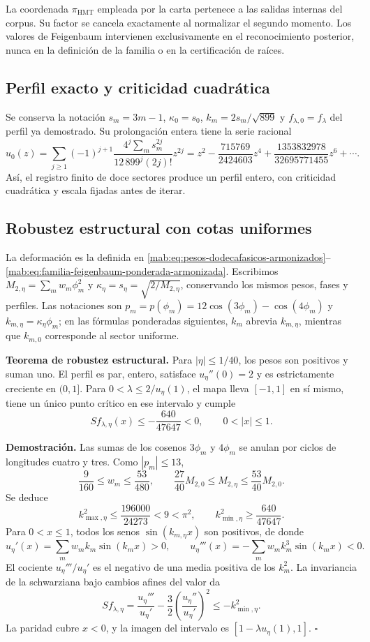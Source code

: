 La coordenada \(\pi_{\mathrm{HMT}}\) empleada por la carta pertenece a las salidas internas del corpus. Su factor se cancela exactamente al normalizar el segundo momento. Los valores de Feigenbaum intervienen exclusivamente en el reconocimiento posterior, nunca en la definición de la familia o en la certificación de raíces.


\subsection{Perfil exacto y criticidad cuadrática}
\label{hmtfg:desarrollo:2}

Se conserva la notación $s_m=3m-1$, $\kappa_0=s_0$, $k_m=2s_m/\sqrt{899}$ y $f_{\lambda,0}=f_\lambda$ del perfil ya demostrado. Su prolongación entera tiene la serie racional
\[
u_0(z)=\sum_{j\ge1}(-1)^{j+1}
\frac{4^j\sum_m s_m^{2j}}{12\,899^j(2j)!}z^{2j}
=z^2-\frac{715769}{2424603}z^4
+\frac{1353832978}{32695771455}z^6+\cdots.
\]
Así, el registro finito de doce sectores produce un perfil entero, con criticidad cuadrática y escala fijadas antes de iterar.


\subsection{Robustez estructural con cotas uniformes}
\label{hmtfg:desarrollo:3}

La deformación es la definida en \eqref{mab:eq:pesos-dodecafasicos-armonizados}--\eqref{mab:eq:familia-feigenbaum-ponderada-armonizada}. Escribimos $M_{2,\eta}=\sum_mw_m\phi_m^2$ y $\kappa_\eta=s_\eta=\sqrt{2/M_{2,\eta}}$, conservando los mismos pesos, fases y perfiles.
Las notaciones son $p_m=p(\phi_m)=12\cos(3\phi_m)-\cos(4\phi_m)$ y $k_{m,\eta}=\kappa_\eta\phi_m$; en las fórmulas ponderadas siguientes, $k_m$ abrevia $k_{m,\eta}$, mientras que $k_{m,0}$ corresponde al sector uniforme.

\textbf{Teorema de robustez estructural.} Para \(|\eta|\le1/40\), los pesos son positivos y suman uno. El perfil es par, entero, satisface \(u_\eta''(0)=2\) y es estrictamente creciente en \((0,1]\). Para \(0<\lambda\le2/u_\eta(1)\), el mapa lleva \([-1,1]\) en sí mismo, tiene un único punto crítico en ese intervalo y cumple
\[
S f_{\lambda,\eta}(x)\le-\frac{640}{47647}<0,\qquad0<|x|\le1.
\]

\textbf{Demostración.} Las sumas de los cosenos \(3\phi_m\) y \(4\phi_m\) se anulan por ciclos de longitudes cuatro y tres. Como \(|p_m|\le13\),
\[
\frac9{160}\le w_m\le\frac{53}{480},\qquad
\frac{27}{40}M_{2,0}\le M_{2,\eta}\le\frac{53}{40}M_{2,0}.
\]
Se deduce
\[
k_{\max,\eta}^2\le\frac{196000}{24273}<9<\pi^2,\qquad
k_{\min,\eta}^2\ge\frac{640}{47647}.
\]
Para \(0<x\le1\), todos los senos \(\sin(k_{m,\eta}x)\) son positivos, de donde
\[
u_\eta'(x)=\sum_mw_mk_m\sin(k_mx)>0,\qquad
u_\eta'''(x)=-\sum_mw_mk_m^3\sin(k_mx)<0.
\]
El cociente \(u_\eta'''/u_\eta'\) es el negativo de una media positiva de los \(k_m^2\). La invariancia de la schwarziana bajo cambios afines del valor da
\[
S f_{\lambda,\eta}
=\frac{u_\eta'''}{u_\eta'}-\frac32
\left(\frac{u_\eta''}{u_\eta'}\right)^2
\le-k_{\min,\eta}^2.
\]
La paridad cubre \(x<0\), y la imagen del intervalo es
\([1-\lambda u_\eta(1),1]\). \(\square\)

